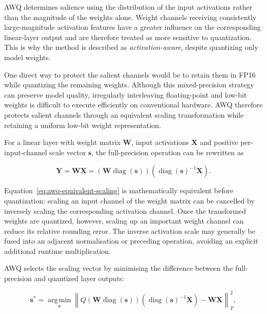 AWQ determines salience using the distribution of the input
activations rather than the magnitude of the weights alone. Weight
channels receiving consistently large-magnitude activation features
have a greater influence on the corresponding linear-layer output and
are therefore treated as more sensitive to quantization. This is why
the method is described as \emph{activation-aware}, despite quantizing
only model weights.

One direct way to protect the salient channels would be to retain them
in FP16 while quantizing the remaining weights. Although this
mixed-precision strategy can preserve model quality, irregularly
interleaving floating-point and low-bit weights is difficult to execute
efficiently on conventional hardware. AWQ therefore protects salient
channels through an equivalent scaling transformation while retaining a
uniform low-bit weight representation.

For a linear layer with weight matrix \(\mathbf{W}\), input
activations \(\mathbf{X}\) and positive per-input-channel scale vector
\(\mathbf{s}\), the full-precision operation can be rewritten as

\begin{equation}
\mathbf{Y}
=
\mathbf{W}\mathbf{X}
=
\left(
\mathbf{W}\operatorname{diag}(\mathbf{s})
\right)
\left(
\operatorname{diag}(\mathbf{s})^{-1}\mathbf{X}
\right).
\label{eq:awq-equivalent-scaling}
\end{equation}

Equation~\eqref{eq:awq-equivalent-scaling} is mathematically equivalent
before quantization: scaling an input channel of the weight matrix can
be cancelled by inversely scaling the corresponding activation
channel. Once the transformed weights are quantized, however, scaling
up an important weight channel can reduce its relative rounding error.
The inverse activation scale may generally be fused into an adjacent
normalisation or preceding operation, avoiding an explicit additional
runtime multiplication.

AWQ selects the scaling vector by minimising the difference between the
full-precision and quantized layer outputs:

\begin{equation}
\mathbf{s}^{*}
=
\underset{\mathbf{s}}{\operatorname{arg\,min}}
\left\|
Q\left(
\mathbf{W}\operatorname{diag}(\mathbf{s})
\right)
\left(
\operatorname{diag}(\mathbf{s})^{-1}\mathbf{X}
\right)
-
\mathbf{W}\mathbf{X}
\right\|_{F}^{2},
\label{eq:awq-scaling-objective}
\end{equation}

